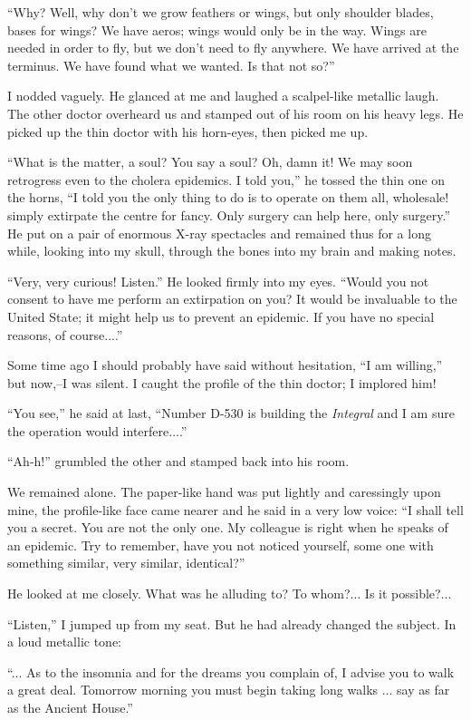 \documentclass[11pt,openany]{book}
\begin{document}
``Why? Well, why don't we grow feathers or wings, but only shoulder blades, bases for wings? We have aeros; wings would only be in the way. Wings are needed in order to fly, but we don't need to fly anywhere. We have arrived at the terminus. We have found what we wanted. Is that not so?''

I nodded vaguely. He glanced at me and laughed a scalpel-like metallic laugh. The other doctor overheard us and stamped out of his room on his heavy legs. He picked up the thin doctor with his horn-eyes, then picked me up.

``What is the matter, a soul? You say a soul? Oh, damn it! We may soon retrogress even to the cholera epidemics. I told you,'' he tossed the thin one on the horns, ``I told you the only thing to do is to operate on them all, wholesale! simply extirpate the centre for fancy. Only surgery can help here, only surgery.'' He put on a pair of enormous X-ray spectacles and remained thus for a long while, looking into my skull, through the bones into my brain and making notes.

``Very, very curious! Listen.'' He looked firmly into my eyes. ``Would you not consent to have me perform an extirpation on you? It would be invaluable to the United State; it might help us to prevent an epidemic. If you have no special reasons, of course....''

Some time ago I should probably have said without hesitation, ``I am willing,'' but now,--I was silent. I caught the profile of the thin doctor; I implored him!

``You see,'' he said at last, ``Number D-530 is building the \emph{Integral} and I am sure the operation would interfere....''

``Ah-h!'' grumbled the other and stamped back into his room.

We remained alone. The paper-like hand was put lightly and caressingly upon mine, the profile-like face came nearer and he said in a very low voice: ``I shall tell you a secret. You are not the only one. My colleague is right when he speaks of an epidemic. Try to remember, have you not noticed yourself, some one with something similar, very similar, identical?''

He looked at me closely. What was he alluding to? To whom?... Is it possible?...

``Listen,'' I jumped up from my seat. But he had already changed the subject. In a loud metallic tone:

``... As to the insomnia and for the dreams you complain of, I advise you to walk a great deal. Tomorrow morning you must begin taking long walks ... say as far as the Ancient House.''
\end{document}
